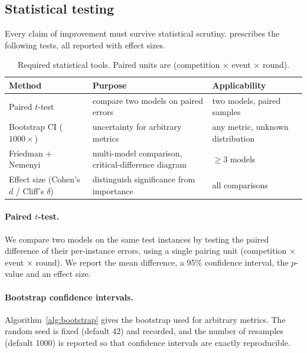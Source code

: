 \subsection{Statistical testing}
\label{sec:protocol-stats}

Every claim of improvement must survive statistical scrutiny. \wcabench{}
prescribes the following tests, all reported with effect sizes.

\begin{table}[t]
  \centering
  \footnotesize
  \begin{threeparttable}
  \caption{Required statistical tools. Paired units are
  (competition $\times$ event $\times$ round).}
  \label{tab:stats}
  \begin{tabularx}{\linewidth}{@{}>{\raggedright\arraybackslash}p{3.3cm}
                                >{\raggedright\arraybackslash}X
                                >{\raggedright\arraybackslash}X@{}}
    \toprule
    Method & Purpose & Applicability \\
    \midrule
    Paired $t$-test & compare two models on paired errors
      & two models, paired samples \\
    Bootstrap CI ($1000\times$) & uncertainty for arbitrary metrics
      & any metric, unknown distribution \\
    Friedman $+$ Nemenyi & multi-model comparison, critical-difference diagram
      & $\ge 3$ models \\
    Effect size (Cohen's $d$ / Cliff's $\delta$)
      & distinguish significance from importance & all comparisons \\
    \bottomrule
  \end{tabularx}
  \end{threeparttable}
\end{table}

\paragraph{Paired $t$-test.}
We compare two models on the same test instances by testing the paired
difference of their per-instance errors, using a single pairing unit
(competition $\times$ event $\times$ round). We report the mean difference, a
95\% confidence interval, the $p$-value and an effect size.

\paragraph{Bootstrap confidence intervals.}
Algorithm~\ref{alg:bootstrap} gives the bootstrap used for arbitrary metrics.
The random seed is fixed (default 42) and recorded, and the number of
resamples (default 1000) is reported so that confidence intervals are exactly
reproducible.

